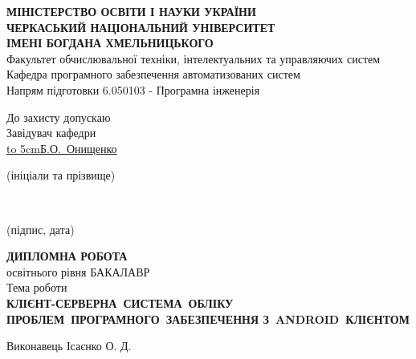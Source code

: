 \documentclass[../main.tex]{subfiles}
\begin{document}
\begin{titlepage}
    \centering
    {\bfseries
    \MakeUppercase{Міністерство освіти і науки України} \\
    \MakeUppercase{Черкаський національний університет} \\
    \MakeUppercase{імені Богдана Хмельницького} \\}
    Факультет обчислювальної техніки, інтелектуальних та управляючих систем \\
    Кафедра програмного забезпечення автоматизованих систем \\
    Напрям підготовки 6.050103 - Програмна інженерія \\
    \begin{flushright}
        \begin{minipage}[t]{5cm}
            \begin{flushright}
                До захисту допускаю \\
                Завідувач кафедри \\
                \underline{\hbox to 5cm{\hfill Б.О.~Онищенко \hfill}} \\
                \vspace{-0.125\baselineskip}
                {\footnotesize\centering (ініціали та прізвище)\par}
                \hrulefill \\
                \vspace{-0.375\baselineskip}
                {\footnotesize\centering (підпис, дата)\par}
            \end{flushright}
        \end{minipage}
    \end{flushright}
    \vfill
    {\large %
    {\scshape\bfseries \MakeUppercase{Дипломна робота} \\}
    освітнього рівня БАКАЛАВР \\
    Тема роботи \\
    {\scshape\bfseries \MakeUppercase{Клієнт-серверна~система~обліку проблем~програмного~забезпечення з~Android~клієнтом} \\}
    }
    \vfill
    {
	    \begin{flushright}
			\begin{minipage}[t]{4.2cm}
				\begin{flushright}
					Виконавець Ісаєнко О. Д. \\

\end{flushright}
\end{minipage}
\end{flushright}}
\end{titlepage}
\end{document}
